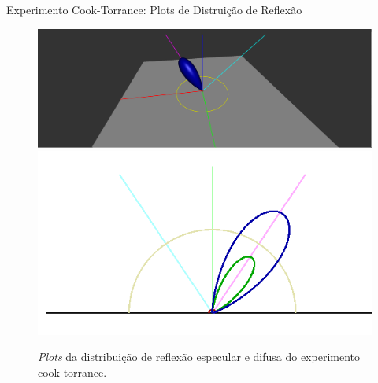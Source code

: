 \begin{frame}{Experimento Cook-Torrance: Plots de Distruição de Reflexão}
\begin{figure}[H]
  
\caption{\small{\textit{Plots} da distribuição de reflexão especular e difusa do experimento cook-torrance.}}
    \label{fig-cook-torrance-plots}
    \vspace{42px}
  \includegraphics[width=\linewidth]{./Imagens/brdfs/cook-torrance-3D-plot}
\endminipage\hfill
{}
  \includegraphics[width=\linewidth]{./Imagens/brdfs/cook-torrance-polar-plot-log.png}
\endminipage\hfill
\end{figure}
\end{frame}

